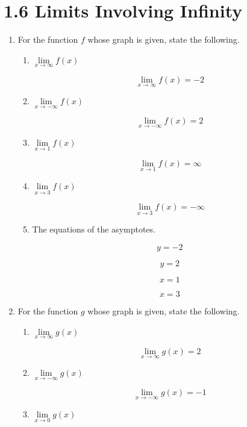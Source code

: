 \documentclass{article}
\begin{document}
	\section{1.6 Limits Involving Infinity}

	\begin{enumerate}
		\item For the function $f$ whose graph is given, state the
			following.

		\begin{enumerate}
			\item $\lim \limits _{x \to \infty} f(x)$

			$$\lim \limits _{x \to \infty} f(x) = -2$$

			\item $\lim \limits _{x \to -\infty} f(x)$

			$$\lim \limits _{x \to -\infty} f(x) = 2$$

			\item $\lim \limits _{x \to 1} f(x)$

			$$\lim \limits _{x \to 1} f(x) = \infty$$

			\item $\lim \limits _{x \to 3} f(x)$

			$$\lim \limits _{x \to 3} f(x) = -\infty$$

			\item The equations of the asymptotes.

			$$y = -2$$

			$$y = 2$$

			$$x = 1$$

			$$x = 3$$
			
		\end{enumerate}


		\item For the function $g$ whose graph is given, state the following.

		\begin{enumerate}
			\item $\lim \limits _{x \to \infty} g(x)$

			$$\lim \limits _{x \to \infty} g(x) = 2$$

			\item $\lim \limits _{x \to -\infty} g(x)$

			$$\lim \limits _{x \to -\infty} g(x) = -1$$

			\item $\lim \limits _{x \to 0} g(x)$


\end{enumerate}
\end{enumerate}
\end{document}
